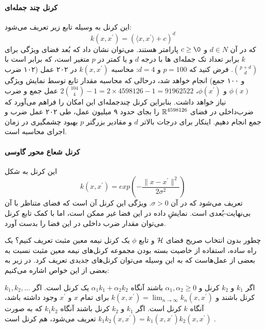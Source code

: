 \paragraph{کرنل چند جمله‌ای}
این کرنل به وسیله تابع زیر تعریف می‌شود:
\begin{equation*}
k(x,x^\prime) = (\langle{x,x^\prime}\rangle + c)^d
\end{equation*}
که در آن $d \in N$ و $c \geq \0 $ پارامتر هستند. می‌توان نشان داد که بُعد فضای ویژگی برای $k$ برابر تعداد تک جمله‌ای ها با درجه $d$ و یا کمتر در $p$ متغیر است، که برابر است با $p+d\choose d$. فرض کنید که $ p = 100 $ و $ d = 4 $: محاسبه $k(x,x^\prime)$ در ۲۰۲ عمل (۱۰۲ ضرب و ۱۰۰ جمع) انجام خواهد شد، درحالی که محاسبه مقدار تابع توسط نمایش ویژگی $\phi(x)$ و $ \phi(x^\prime) $، 
$2{104\choose 4} - 1 = 2\times 4598126−1 = 91962522$ عمل جمع و ضرب نیاز خواهد داشت. بنابراین کرنل چندجمله‌ای این امکان را فراهم می‌آورد که ضرب‌داخلی در فضای 
$\mathbb{R}^{4598126}$  را بجای حدود ۹ میلیون عمل، طی ۲۰۲ عمل ضرب و جمع انجام دهیم.
اینکار برای درجات بالاتر $d$ و مقادیر بزرگتر $p$ بهبود چشمگیری در زمان اجرای محاسبه است.

\paragraph{کرنل شعاع محور گاوسی}
 این کرنل به شکل 
\begin{equation}\label{eq:gaussian-kernel}
k(x,x^\prime) = exp(-\dfrac{\|x - x^\prime\|^2}{2\sigma^2})
\end{equation}
تعریف می‌شود که در آن $\sigma > 0$. ویژگی این کرنل آن است که فضای  متناظر با آن بی‌نهایت-بُعدی است. نمایشِ داده در این فضا غیر ممکن است، اما با کمک تابع کرنل می‌توان مقدار ضرب داخلی در این فضا را بدست آورد.

چطور بدون انتخاب صریح فضای $\mathcal{H}$ و تابع $\phi$ یک کرنل نیمه معین مثبت تعریف کنیم؟ یک راه ساده، استفاده از خاصیت بسته بودن مجموعه کرنل‌های نیمه معین مثبت نسبت به بعضی از عمل‌هاست که به این وسیله می‌توان کرنل‌های جدیدی تعریف کرد. در زیر به بعضی از این خواص اشاره می‌کنیم:

\begin{itemize}
 اگر $k_1$ و $k_2$ کرنل و 
$\alpha_1,\alpha_2 \geq 0$ باشند
 آنگاه $\alpha_1k_1 + \alpha_2k_2$ یک کرنل است.
 اگر $k_1,k_2,...$ کرنل باشند و 
$k(x,x^\prime) = \lim_{n \to \infty}k_n(x,x^\prime)$
برای تمام $x$ و $x^\prime$ وجود داشته باشد، آنگاه $k$ کرنل است.
 اگر $k_1$ و $k_2$ کرنل باشند آنگاه $k_1k_2$ که به صورت 
$k_1k_2(x,x^\prime) = k_1(x,x^\prime)k_2(x,x^\prime)$ تعریف می‌شود، هم کرنل است .
\end{itemize}

